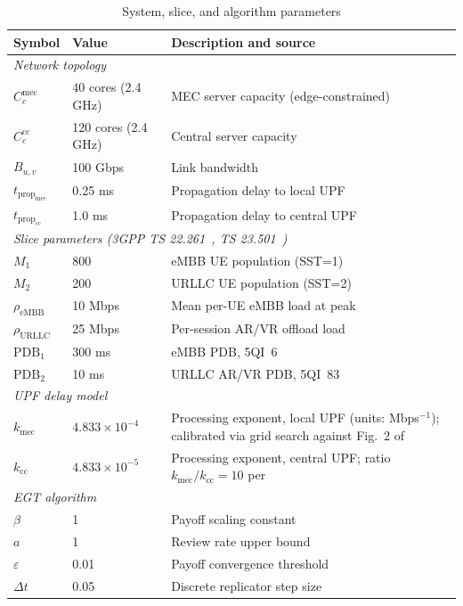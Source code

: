 \documentclass[conference]{IEEEtran}
\begin{document}
\begin{table}[ht]
\centering
\caption{System, slice, and algorithm parameters}
\label{tab:params}
\renewcommand{\arraystretch}{1.15}
\begin{tabular}{p{1.8cm}p{1.9cm}p{3.9cm}}
\toprule
\textbf{Symbol} & \textbf{Value} &
\textbf{Description and source} \\
\midrule
\multicolumn{3}{l}{\textit{Network topology}} \\
$C_c^\text{mec}$ & 40 cores (2.4 GHz) &
  MEC server capacity (edge-constrained) \\
$C_c^\text{cc}$ & 120 cores (2.4 GHz) &
  Central server capacity \\
$B_{u,v}$ & 100 Gbps &
  Link bandwidth \\
$t_{\text{prop}_\text{mec}}$ & 0.25 ms &
  Propagation delay to local UPF \\
$t_{\text{prop}_\text{cc}}$ & 1.0 ms &
  Propagation delay to central UPF \\
\midrule
\multicolumn{3}{l}{\textit{Slice parameters
  (3GPP TS 22.261~\cite{3gpp_ts22261},
   TS 23.501~\cite{3gpp_ts23501})}} \\
$M_1$ & 800 &
  eMBB UE population (SST=1) \\
$M_2$ & 200 &
  URLLC UE population (SST=2) \\
$\rho_\text{eMBB}$ & 10 Mbps &
  Mean per-UE eMBB load at
  peak~\cite{superbowl_lvii,ericsson_f1_2023} \\
$\rho_\text{URLLC}$ & 25 Mbps &
  Per-session AR/VR offload
  load~\cite{yaqoob2020survey_360video} \\
$\text{PDB}_1$ & 300 ms &
  eMBB PDB, 5QI~6~\cite{3gpp_ts23501} \\
$\text{PDB}_2$ & 10 ms &
  URLLC AR/VR PDB,
  5QI~83~\cite{3gpp_ts22261} \\
\midrule
\multicolumn{3}{l}{\textit{UPF delay
  model~\cite{Alevizaki2021upf}}} \\
$k_\text{mec}$ & $4.833\!\times\!10^{-4}$ &
  Processing exponent, local UPF
  (units: Mbps$^{-1}$); calibrated via
  grid search against Fig.~2
  of~\cite{Alevizaki2021upf} \\
$k_\text{cc}$ & $4.833\!\times\!10^{-5}$ &
  Processing exponent, central UPF;
  ratio $k_\text{mec}/k_\text{cc}=10$
  per~\cite{Alevizaki2021upf} \\
\midrule
\multicolumn{3}{l}{\textit{EGT algorithm~\cite{Alevizaki2021upf}}}\\
$\beta$ & 1 &
  Payoff scaling constant \\
$a$ & 1 &
  Review rate upper bound \\
$\varepsilon$ & 0.01 &
  Payoff convergence threshold \\
$\Delta t$ & 0.05 &
  Discrete replicator step size \\
\bottomrule
\end{tabular}
\end{table}
\end{document}
